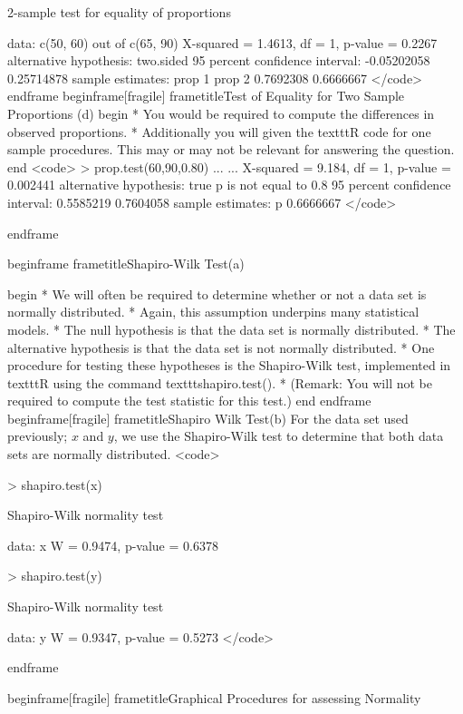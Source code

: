         2-sample test for equality of proportions

data:  c(50, 60) out of c(65, 90)
X-squared = 1.4613, df = 1, p-value = 0.2267
alternative hypothesis: two.sided
95 percent confidence interval:
 -0.05202058  0.25714878
sample estimates:
   prop 1    prop 2
0.7692308 0.6666667
</code>
end{frame}
begin{frame}[fragile]
frametitle{Test of Equality for Two Sample Proportions (d)}
begin{ }
         * You would be required to compute the differences in observed proportions.
         * Additionally you will given the texttt{R} code for one sample procedures. This may or may not be relevant for answering the question.
end{ }
<code>
> prop.test(60,90,0.80)
...
...
X-squared = 9.184, df = 1, p-value = 0.002441
alternative hypothesis: true p is not equal to 0.8
95 percent confidence interval:
 0.5585219 0.7604058
sample estimates:
        p
0.6666667
</code>

end{frame}





begin{frame}
frametitle{Shapiro-Wilk Test(a)}


begin{ }
         * We will often be required to determine whether or not a data set is normally distributed.
         * Again, this assumption underpins many statistical models.
         * The null hypothesis is that the data set is normally distributed.
         * The alternative hypothesis is that the data set is not normally distributed.
         * One procedure for testing these hypotheses is the Shapiro-Wilk test, implemented in texttt{R} using the command texttt{shapiro.test()}.
         * (Remark: You will not be required to compute the test statistic for this test.)
end{ }
end{frame}
begin{frame}[fragile]
frametitle{Shapiro Wilk Test(b)}
For the data set used previously; $x$ and $y$, we use the Shapiro-Wilk test to determine that both data sets are normally distributed.
<code>

> shapiro.test(x)

        Shapiro-Wilk normality test

data:  x
W = 0.9474, p-value = 0.6378

> shapiro.test(y)

        Shapiro-Wilk normality test

data:  y
W = 0.9347, p-value = 0.5273
</code>

end{frame}


begin{frame}[fragile]
frametitle{Graphical Procedures for assessing Normality}

